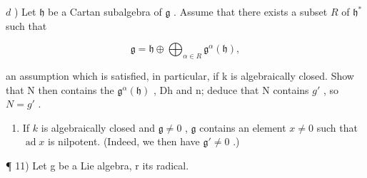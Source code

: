 \(d\) ) Let \(\mathfrak{h}\) be a Cartan subalgebra of \(\mathfrak{g}\) . Assume that there exists a subset \(R\) of \(\mathfrak{h}^*\) such that

\[
\mathfrak {g} = \mathfrak {h} \oplus \bigoplus_ {\alpha \in R} \mathfrak {g} ^ {\alpha} (\mathfrak {h}),
\]

an assumption which is satisfied, in particular, if k is algebraically closed. Show that N then contains the \(\mathfrak{g}^{\alpha}(\mathfrak{h})\) , Dh and n; deduce that N contains \(g'\) , so \(N = g'\) .

\begin{enumerate}
\def\labelenumi{\alph{enumi})}
\setcounter{enumi}{4}
\tightlist
\item
  If \(k\) is algebraically closed and \(\mathfrak{g} \neq 0\) , \(\mathfrak{g}\) contains an element \(x \neq 0\) such that \(\operatorname{ad} x\) is nilpotent. (Indeed, we then have \(\mathfrak{g}' \neq 0\) .)
\end{enumerate}

¶ 11) Let g be a Lie algebra, r its radical.

